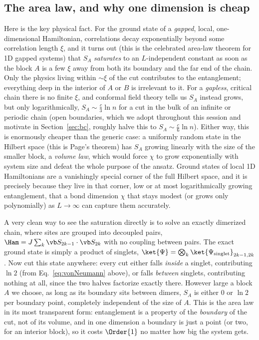 \documentclass[all_sessions.tex]{subfiles}
\begin{document}
\subsection{The area law, and why one dimension is cheap}
Here is the key physical fact. For the ground state of a \emph{gapped}, local, one-dimensional
Hamiltonian, correlations decay exponentially beyond some correlation length $\xi$, and it turns
out (this is the celebrated area-law theorem for 1D gapped systems) that $S_A$ \emph{saturates} to
an $L$-independent constant as soon as the block $A$ is a few $\xi$ away from both its boundary and
the far end of the chain. Only the physics living within $\sim\xi$ of the cut contributes to the
entanglement; everything deep in the interior of $A$ or $B$ is irrelevant to it. For a
\emph{gapless}, critical chain there is no finite $\xi$, and conformal field theory tells us $S_A$
instead grows, but only logarithmically, $S_A \sim \tfrac{c}{3}\ln n$ for a cut in the bulk of an
infinite or periodic chain (open boundaries, which we adopt throughout this session and motivate in
Section~\ref{sec:bc}, roughly halve this to $S_A\sim\tfrac{c}{6}\ln n$). Either way, this is
enormously cheaper than the generic case: a uniformly random state in the Hilbert space (this is
Page's theorem) has $S_A$ growing linearly with the size of the smaller block, a \emph{volume law},
which would force $\chi$ to grow exponentially with system size and defeat the whole purpose of the
ansatz. Ground states of local 1D Hamiltonians are a vanishingly special corner of the full Hilbert
space, and it is precisely because they live in that corner, low or at most logarithmically growing
entanglement, that a bond dimension $\chi$ that stays modest (or grows only polynomially) as
$L\to\infty$ can capture them accurately.

A very clean way to see the saturation directly is to solve an exactly dimerized chain, where sites
are grouped into decoupled pairs, $\Ham = J\sum_k \vb S_{2k-1}\cdot\vb S_{2k}$ with no coupling
between pairs. The exact ground state is simply a product of singlets,
$\ket{\Psi} = \bigotimes_k \ket{\Psi_{\mathrm{singlet}}}_{2k-1,2k}$. Now cut this state anywhere:
every cut either falls \emph{inside} a singlet, contributing $\ln 2$ (from
Eq.~\eqref{eq:vonNeumann} above), or falls \emph{between} singlets, contributing nothing at all,
since the two halves factorize exactly there. However large a block $A$ we choose, as long as its
boundary sits between dimers, $S_A$ is either $0$ or $\ln2$ per boundary point, completely
independent of the size of $A$. This is the area law in its most transparent form: entanglement is
a property of the \emph{boundary} of the cut, not of its volume, and in one dimension a boundary is
just a point (or two, for an interior block), so it costs $\Order{1}$ no matter how big the system
gets.
\end{document}
